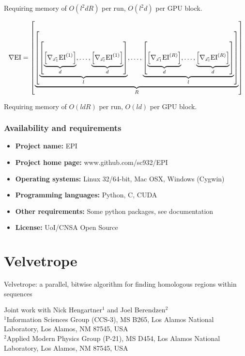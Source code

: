 \documentclass[phd,tocprelim]{cornell}
\begin{document}
Requiring memory of $O(l^{2}dR)$ per run, $O(l^{2}d)$ per GPU block.

\begin{equation}
    \nabla {\rm EI} = \left[ \underbrace{ \left[ \underbrace{ \left[ \underbrace{ \left[ \nabla_{\vec{x_{1}}} {\rm EI}^{(1)} \right]}_{d} , \ldots, \underbrace{ \left[ \nabla_{\vec{x_{l}}} {\rm EI}^{(1)} \right]}_{d}\right]}_{l}, \ldots, \underbrace{ \left[ \underbrace{ \left[ \nabla_{\vec{x_{1}}} {\rm EI}^{(R)} \right]}_{d} , \ldots, \underbrace{ \left[ \nabla_{\vec{x_{l}}} {\rm EI}^{(R)} \right]}_{d}\right]}_{l} \right]}_{R} \right]\end{equation}

Requiring memory of $O(ldR)$ per run, $O(ld)$ per GPU block.




\section{Availability and requirements}
 \begin{itemize}
  \item \textbf{Project name:} EPI
  \item \textbf{Project home page:} www.github.com/sc932/EPI
  \item \textbf{Operating systems:} Linux 32/64-bit, Mac OSX, Windows (Cygwin)
  \item \textbf{Programming languages:} Python, C, CUDA
  \item \textbf{Other requirements:} Some python packages, see documentation
  \item \textbf{License:} UoI/CNSA Open Source
 \end{itemize}




\part{Velvetrope} %
\label{prt:Velvetrope}
\singlespacing

\noindent
\Large
Velvetrope: a parallel, bitwise algorithm for finding homologous regions within sequences

\noindent
\normalsize
Joint work with Nick Hengartner$^{1}$ and Joel Berendzen$^{2}$ \\
\scriptsize
$^{1}$Information Sciences Group (CCS-3), MS B265, Los Alamos National
 Laboratory, Los Alamos, NM 87545, USA \\
$^{2}$Applied Modern Physics Group (P-21), MS D454, Los Alamos National
 Laboratory, Los Alamos, NM 87545, USA
\normalsize
\end{document}
